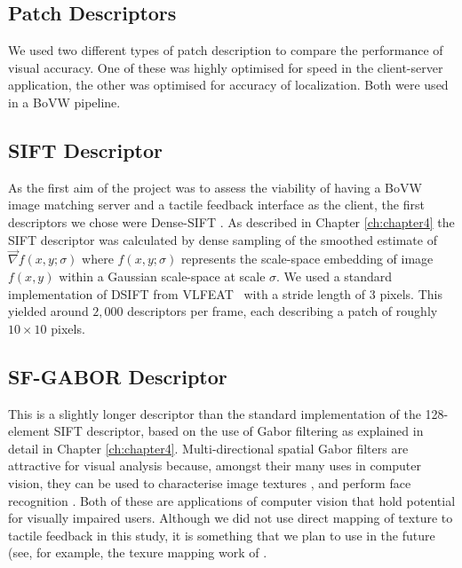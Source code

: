 \subsection{Patch Descriptors}
We used two different types of patch description to compare the performance of visual accuracy.  One of these was highly optimised for speed in the client-server application, the other was optimised for accuracy of localization.  Both were used in a BoVW pipeline.


\subsection{SIFT Descriptor}
As the first aim of the project was to assess the viability of having a BoVW image matching server and a tactile feedback interface as the client, the first descriptors we chose were Dense-SIFT \citep{Lowe1999,LazebnikSP06,Vedaldi2008}. As described in Chapter \ref{ch:chapter4} the SIFT descriptor was calculated by dense sampling of the smoothed estimate of $\vec{\nabla}f(x,y;\sigma)$ where $f(x,y;\sigma)$ represents the scale-space embedding of image $f(x,y)$ within a Gaussian scale-space at scale $\sigma$.  We used a standard implementation of DSIFT from VLFEAT~\citep{Vedaldi2008} with a stride length of 3 pixels. This yielded around $2,000$ descriptors per frame, each describing a patch of roughly $10 \times 10$ pixels.

\subsection{SF-GABOR Descriptor}
This is a slightly longer descriptor than the standard implementation of the 128-element SIFT descriptor, based on the use of Gabor filtering as explained in detail in Chapter \ref{ch:chapter4}.  Multi-directional spatial Gabor filters are attractive for visual analysis because, amongst their many uses in computer vision, they can be used to characterise image textures \citep{jain1990unsupervised,weldon1996efficient,adi2009texture}, and perform face recognition \citep{yang2013gabor}. Both of these are applications of computer vision that hold potential for visually impaired users. Although we did not use direct mapping of texture to tactile feedback in this study, it is something that we plan to use in the future (see, for example, the texure mapping work of \cite{adi2009texture}. 

